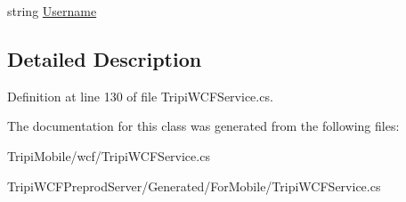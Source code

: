 \begin{DoxyCompactItemize}
\begin{DoxyCompactList}\small\item\em \item\end{DoxyCompactList}\item 
\hypertarget{class_trip_adb6f9c38b858cf4101e9325f08bbd4ec}{
string \hyperlink{class_trip_adb6f9c38b858cf4101e9325f08bbd4ec}{Username}}
\label{class_trip_adb6f9c38b858cf4101e9325f08bbd4ec}

\begin{DoxyCompactList}\small\item\em \item\end{DoxyCompactList}\end{DoxyCompactItemize}


\subsection{Detailed Description}


Definition at line 130 of file TripiWCFService.cs.

The documentation for this class was generated from the following files:\begin{DoxyCompactItemize}
\item 
TripiMobile/wcf/TripiWCFService.cs\item 
TripiWCFPreprodServer/Generated/ForMobile/TripiWCFService.cs\end{DoxyCompactItemize}
